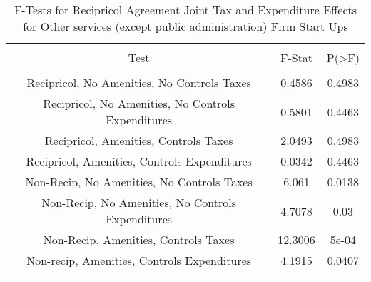 
\begin{table}[!htbp] \centering 
  \caption{F-Tests for Recipricol Agreement Joint Tax and Expenditure Effects for Other services (except public administration) Firm Start Ups} 
  \label{81Ftests} 
\begin{tabular}{@{\extracolsep{5pt}} ccc} 
\\[-1.8ex]\hline 
\hline \\[-1.8ex] 
Test & F-Stat & P(\textgreater F) \\ 
\hline \\[-1.8ex] 
Recipricol, No Amenities, No Controls Taxes & 0.4586 & 0.4983 \\ 
Recipricol, No Amenities, No Controls Expenditures & 0.5801 & 0.4463 \\ 
Recipricol, Amenities, Controls Taxes & 2.0493 & 0.4983 \\ 
Recipricol, Amenities, Controls Expenditures & 0.0342 & 0.4463 \\ 
Non-Recip, No Amenities, No Controls Taxes & 6.061 & 0.0138 \\ 
Non-Recip, No Amenities, No Controls Expenditures & 4.7078 & 0.03 \\ 
Non-Recip, Amenities, Controls Taxes & 12.3006 & 5e-04 \\ 
Non-recip, Amenities, Controls Expenditures & 4.1915 & 0.0407 \\ 
\hline \\[-1.8ex] 
\end{tabular} 
\end{table} 
